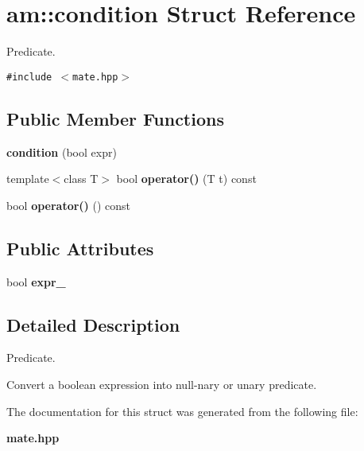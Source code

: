 \section{am::condition Struct Reference}
\label{structam_1_1condition}
Predicate.  


{\tt \#include $<$mate.hpp$>$}

\subsection*{Public Member Functions}
\begin{CompactItemize}
\item 
\textbf{condition} (bool expr)\label{structam_1_1condition_82253727f9840bf92be5fe9ac6f030f3}

\item 
template$<$class T$>$ bool \textbf{operator()} (T t) const \label{structam_1_1condition_b2ec8dd69ee9d01f6e063e8ff134aa8e}

\item 
bool \textbf{operator()} () const\label{structam_1_1condition_77b22c0ae8b8f417243fa1418041da9a}

\end{CompactItemize}
\subsection*{Public Attributes}
\begin{CompactItemize}
\item 
bool \textbf{expr\_\-}\label{structam_1_1condition_4847e0ef9b08433407f602ebf9825c18}

\end{CompactItemize}


\subsection{Detailed Description}
Predicate. 

Convert a boolean expression into null-nary or unary predicate. 



The documentation for this struct was generated from the following file:\begin{CompactItemize}
\item 
{\bf mate.hpp}\end{CompactItemize}
